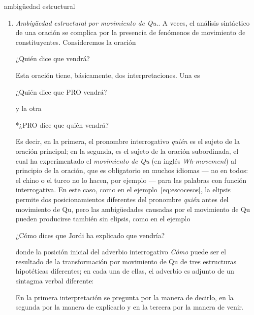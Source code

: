 \begin{persabermes}{ambigüedad estructural}
\begin{enumerate}
\item \emph{Ambigüedad estructural por movimiento de Qu.}. A veces, el análisis sintáctico de una oración se complica por la presencia de fenómenos de movimiento de constituyentes. Consideremos la oración \begin{example} ¿Quién dice que vendrá? \end{example} Esta oración tiene, básicamente, dos interpretaciones. Una es \begin{example} ¿Quién dice que PRO vendrá? \end{example} y la otra \begin{example} *¿PRO dice que quién vendrá? \end{example} Es decir, en la primera, el pronombre interrogativo \emph{quién} es el sujeto de la oración principal; en la segunda, es el sujeto de la oración subordinada, el cual ha experimentado el \emph{movimiento de Qu} (en inglés \emph{Wh-movement}) al principio de la oración, que es obligatorio en muchos idiomas --- no en todos: el chino o el turco no lo hacen, por ejemplo --- para las palabras con función interrogativa. En este caso, como en el ejemplo~\ref{eq:escocesos}, la elipsis permite dos posicionamientos diferentes del pronombre \emph{quién} antes del movimiento de Qu, pero las ambigüedades causadas por el movimiento de Qu pueden producirse también sin elipsis, como en el ejemplo \begin{exemple} ¿Cómo dices que Jordi ha explicado que vendría? \end{exemple} donde la posición inicial del adverbio interrogativo \emph{Cómo} puede ser el resultado de la transformación por movimiento de Qu de tres estructuras hipotéticas diferentes; en cada una de ellas, el adverbio es adjunto de un sintagma verbal diferente:  En la primera interpretación se pregunta por la manera de decirlo, en la segunda por la manera de explicarlo y en la tercera por la manera de venir. 


\end{enumerate}
\end{persabermes}
